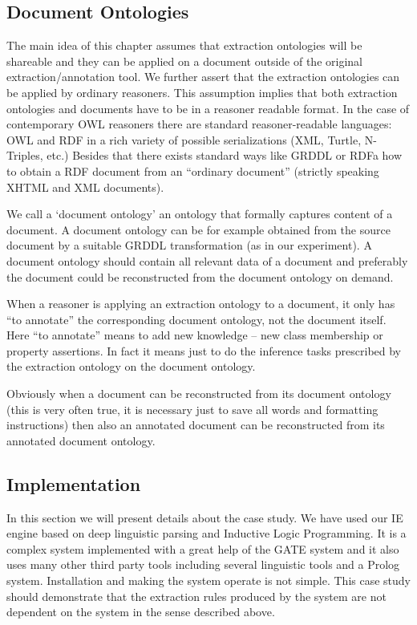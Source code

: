 \subsection{Document Ontologies} \label{sec:doc_ont}

The main idea of this chapter assumes that extraction ontologies will be shareable and they can be applied on a document outside of the original extraction/annotation tool. We further assert that the extraction ontologies can be applied by ordinary reasoners. This assumption implies that both extraction ontologies and documents have to be in a reasoner readable format. In the case of contemporary OWL reasoners there are standard reasoner-readable languages: OWL and RDF in a rich variety of possible serializations (XML, Turtle, N-Triples, etc.) Besides that there exists standard ways like GRDDL or RDFa how to obtain a RDF document from an ``ordinary document'' (strictly speaking XHTML and XML documents).

We call a `document ontology' an ontology that formally captures content of a document. A document ontology can be for example obtained from the source document by a suitable GRDDL transformation (as in our experiment). A document ontology should contain all relevant data of a document and preferably the document could be reconstructed from the document ontology on demand.

When a reasoner is applying an extraction ontology to a document, it only has ``to annotate'' the corresponding document ontology, not the document itself. Here ``to annotate'' means to add new knowledge -- new class membership or property assertions. In fact it means just to do the inference tasks prescribed by the extraction ontology on the document ontology. 

Obviously when a document can be reconstructed from its document ontology (this is very often true, it is necessary just to save all words and formatting instructions) then also an annotated document can be reconstructed from its annotated document ontology. 


\subsection{Implementation} \label{sec:implement}

In this section we will present details about the case study.  We have used our IE engine \citep{biblio:DedekISWC2010} based on deep linguistic parsing and Inductive Logic Programming. It is a complex system implemented with a great help of the GATE system \citep{dedek:GATE_ACL2002} and it also uses many other third party tools including several linguistic tools and a Prolog system. Installation and making the system operate is not simple. This case study should demonstrate that the extraction rules produced by the system are not dependent on the system in the sense described above.




